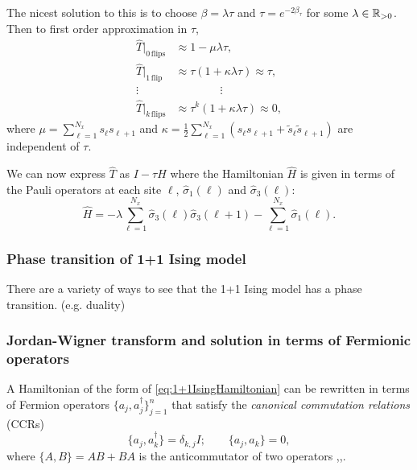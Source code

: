 \documentclass[11pt,reqno]{amsart}
\begin{document}
	The nicest solution to this is to choose $\beta =\lambda \tau$ and $\tau = e^{-2\beta_\tau}$ for some $\lambda \in \mathbb{R}_{>0}$.
	Then to first order approximation in $\tau$,
	\begin{align*}
		\hat{T}|_{0\,\text{flips}} &\approx 1-\mu\lambda\tau, \\
		\hat{T}|_{1\,\text{flip}} &\approx \tau (1+\kappa \lambda\tau) \approx \tau, \\
		\vdots \quad & \qquad\qquad \vdots \\		
		\hat{T}|_{k\,\text{flips}} &\approx \tau^k (1+\kappa \lambda\tau) \approx 0, 
	\end{align*}
    where $\mu=\sum_{\ell=1}^{N_x}s_{\ell}s_{\ell+1}$ and $\kappa=\frac{1}{2}\sum_{\ell=1}^{N_x} (s_{\ell}s_{\ell+1}+\tilde{s}_{\ell}\tilde{s}_{\ell+1})$ are independent of $\tau$.
    
    We can now express $\hat{T}$ as $I- \tau \hat{H}$ where the Hamiltonian $\hat{H}$ is given in terms of the Pauli operators at each site $\ell$, $\hat{\sigma}_1(\ell)$ and $\hat{\sigma}_3(\ell)$:
    \begin{equation}\label{eq:1+1IsingHamiltonian}
    \hat{H}= -\lambda \sum_{\ell=1}^{N_x} \hat{\sigma}_3(\ell)\hat{\sigma}_3(\ell+1) - \sum_{\ell=1}^{N_x} \hat{\sigma}_1(\ell). 
    \end{equation}
    
    \subsubsection{Phase transition of 1+1 Ising model}
    
    There are a variety of ways to see that the 1+1 Ising model has a phase transition.
    (e.g. duality)
    
    \subsubsection{Jordan-Wigner transform and solution in terms of Fermionic operators}
    
    A Hamiltonian of the form of \cref{eq:1+1IsingHamiltonian} can be rewritten in terms of Fermion operators $\{a_j,a^\dagger_j\}_{j=1}^n$ that satisfy the \emph{canonical commutation relations} (CCRs) 
    \[ \{a_j,a_k^\dagger \} = \delta_{k,j}I; \qquad \{a_j,a_k \} =0, \]
    where $\{A,B\} = AB + BA$ is the anticommutator of two operators \cite{KogutGaugeSummary},\cite{nielsen_fermions},\cite{SchultzMattisLieb64}.
    
\end{document}
